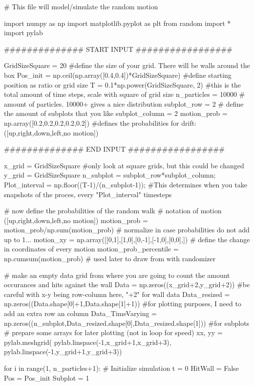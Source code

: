 \begin{python}
# This file will model/simulate the random motion

import numpy as np
import matplotlib.pyplot as plt
from random import *
import pylab

############## START INPUT #################

GridSizeSquare = 20                                         #define the size of your grid. There will be walls around the box
Pos_init = np.ceil(np.array([0.4,0.4])*GridSizeSquare)      #define starting position as ratio or grid size
T = 0.1*np.power(GridSizeSquare, 2)                         #this is the total amount of time steps, scale with square of grid size
n_particles = 10000           # amount of particles. 10000+ gives a nice distribution
subplot_row = 2             # define the amount of subplots that you like
subplot_column = 2
motion_prob = np.array([0.2,0.2,0.2,0.2,0.2])   #defines the probabilities for drift: ([up,right,down,left,no motion]) 

############## END INPUT #################

x_grid = GridSizeSquare     #only look at square grids, but this could be changed
y_grid = GridSizeSquare
n_subplot = subplot_row*subplot_column;
Plot_interval = np.floor((T-1)/(n_subplot-1));          #This determines when you take snapshots of the proces, every "Plot_interval" timesteps

# now define the probabilities of the random walk
# notation of motion ([up,right,down,left,no motion])
motion_prob = motion_prob/np.sum(motion_prob)               # normalize in case probabilities do not add up to 1...
motion_xy = np.array([[0,1],[1,0],[0,-1],[-1,0],[0,0],])    # define the change in coordinates of every motion
motion_prob_percentile = np.cumsum(motion_prob)             # used later to draw from with randomizer

# make an empty data grid from where you are going to count the amount occurances and hits against the wall
Data = np.zeros((x_grid+2,y_grid+2)) #be careful with x-y being row-column here, "+2" for wall data
Data_resized = np.zeros((Data.shape[0]+1,Data.shape[1]+1))  #for plotting purposes, I need to add an extra row an column
Data_TimeVarying = np.zeros((n_subplot,Data_resized.shape[0],Data_resized.shape[1]))    #for subplots
# prepare some arrays for later plotting (not in loop for speed)
xx, yy = pylab.meshgrid(
    pylab.linspace(-1,x_grid+1,x_grid+3),
    pylab.linspace(-1,y_grid+1,y_grid+3))

for i in range(1, n_particles+1):
    # Initialize simulation
    t = 0
    HitWall = False
    Pos = Pos_init
    Subplot = 1
    

\end{python}
